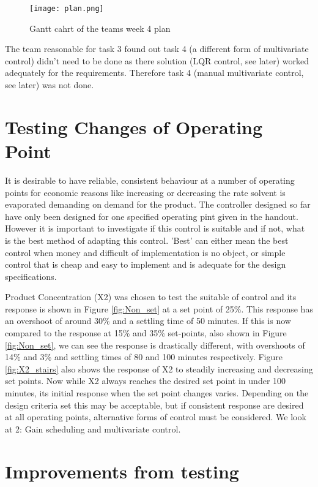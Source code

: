 \documentclass[11pt]{article}
\begin{document}
\begin{figure}[H]
    \centering
    \texttt{[image: plan.png]}
    \caption{Gantt cahrt of the teams week 4 plan}
    \label{fig:my_label}
\end{figure}

The team reasonable for task 3 found out task 4 (a different form of multivariate control) didn't need to be done as there solution (LQR control, see later) worked adequately for the requirements. Therefore task 4 (manual multivariate control, see later) was not done.

\section{Testing Changes of Operating Point}
It is desirable to have reliable, consistent behaviour at a number of operating points for economic reasons like increasing or decreasing the rate solvent is evaporated demanding on demand for the product. The controller designed so far have only been designed for one specified operating pint given in the handout. However it is important to investigate if this control is suitable and if not, what is the best method of adapting this control. 'Best' can either mean the best control when money and difficult of implementation is no object, or simple control that is cheap and easy to implement and is adequate for the design specifications.

Product Concentration (X2) was chosen to test the suitable of control and its response is shown in Figure \ref{fig:Non_set} at a set point of 25\%. This response has an overshoot of around 30\% and a settling time of 50 minutes. If this is now compared to the response at 15\% and 35\% set-points, also shown in Figure \ref{fig:Non_set}, we can see the response is drastically different, with overshoots of 14\% and 3\% and settling times of 80 and 100 minutes respectively. Figure \ref{fig:X2_stairs} also shows the response of X2 to steadily increasing and decreasing set points. Now while X2 always reaches the desired set point in under 100 minutes, its initial response when the set point changes varies. Depending on the design criteria set this may be acceptable, but if consistent response are desired at all operating points, alternative forms of control must be considered. We look at 2: Gain scheduling and multivariate control.

\section{Improvements from testing}
\end{document}

